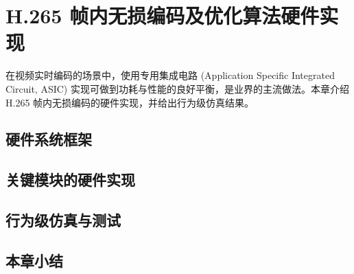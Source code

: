 \chapter{H.265 帧内无损编码及优化算法硬件实现}
\label{cha:c4}
在视频实时编码的场景中，使用专用集成电路 (Application Specific Integrated Circuit, ASIC) 实现可做到功耗与性能的良好平衡，是业界的主流做法。本章介绍 H.265 帧内无损编码的硬件实现，并给出行为级仿真结果。

\section{硬件系统框架}

\section{关键模块的硬件实现}

\section{行为级仿真与测试}

\section{本章小结}